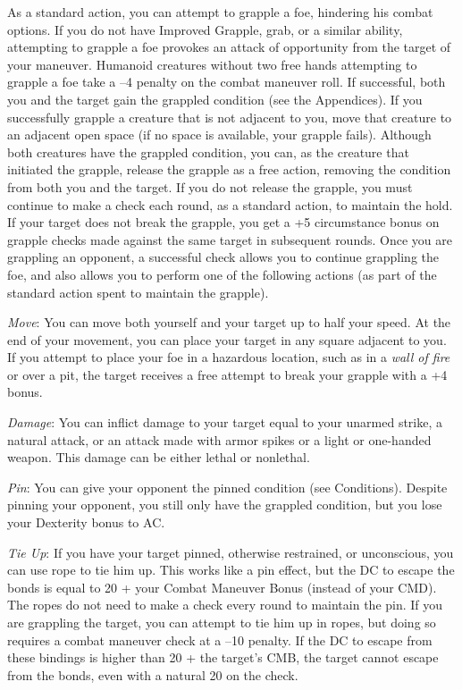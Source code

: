 				
As a standard action, you can attempt to grapple a foe, hindering his combat options. If you do not have Improved Grapple, grab, or a similar ability, attempting to grapple a foe provokes an attack of opportunity from the target of your maneuver. Humanoid creatures without two free hands attempting to grapple a foe take a --4 penalty on the combat maneuver roll. If successful, both you and the target gain the grappled condition (see the Appendices). If you successfully grapple a creature that is not adjacent to you, move that creature to an adjacent open space (if no space is available, your grapple fails). Although both creatures have the grappled condition, you can, as the creature that initiated the grapple, release the grapple as a free action, removing the condition from both you and the target. If you do not release the grapple, you must continue to make a check each round, as a standard action, to maintain the hold. If your target does not break the grapple, you get a +5 circumstance bonus on grapple checks made against the same target in subsequent rounds. Once you are grappling an opponent, a successful check allows you to continue grappling the foe, and also allows you to perform one of the following actions (as part of the standard action spent to maintain the grapple).
				
\textit{Move}: You can move both yourself and your target up to half your speed. At the end of your movement, you can place your target in any square adjacent to you. If you attempt to place your foe in a hazardous location, such as in a \textit{wall of fire} or over a pit, the target receives a free attempt to break your grapple with a +4 bonus.
				
\textit{Damage}: You can inflict damage to your target equal to your unarmed strike, a natural attack, or an attack made with armor spikes or a light or one-handed weapon. This damage can be either lethal or nonlethal.
				
\textit{Pin}: You can give your opponent the pinned condition (see Conditions). Despite pinning your opponent, you still only have the grappled condition, but you lose your Dexterity bonus to AC.
				
\textit{Tie Up}: If you have your target pinned, otherwise restrained, or unconscious, you can use rope to tie him up. This works like a pin effect, but the DC to escape the bonds is equal to 20 + your Combat Maneuver Bonus (instead of your CMD). The ropes do not need to make a check every round to maintain the pin. If you are grappling the target, you can attempt to tie him up in ropes, but doing so requires a combat maneuver check at a --10 penalty. If the DC to escape from these bindings is higher than 20 + the target's CMB, the target cannot escape from the bonds, even with a natural 20 on the check.
				
